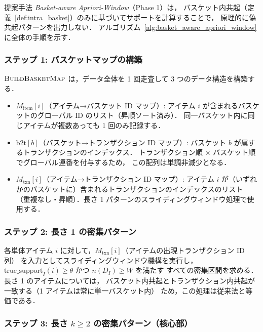 提案手法 \emph{Basket-aware Apriori-Window}（Phase 1）は，
バスケット内共起（定義~\ref{def:intra_basket}）のみに基づいてサポートを計算することで，
原理的に偽共起パターンを出力しない．
アルゴリズム~\ref{alg:basket_aware_apriori_window} に全体の手順を示す．



\subsubsection{ステップ 1: バスケットマップの構築}

$\Call{BuildBasketMap}{}$ は，データ全体を 1 回走査して 3 つのデータ構造を構築する．

\begin{itemize}
    \item $M_{\text{item}}[i]$（アイテム→バスケット ID マップ）:
    アイテム $i$ が含まれるバスケットのグローバル ID のリスト（昇順ソート済み）．
    同一バスケット内に同じアイテムが複数あっても 1 回のみ記録する．

    \item $\text{b2t}[b]$（バスケット→トランザクション ID マップ）:
    バスケット $b$ が属するトランザクションのインデックス．
    トランザクション順 × バスケット順でグローバル連番を付与するため，
    この配列は単調非減少となる．

    \item $M_{\text{txn}}[i]$（アイテム→トランザクション ID マップ）:
    アイテム $i$ が（いずれかのバスケットに）含まれるトランザクションのインデックスのリスト
    （重複なし・昇順）．長さ 1 パターンのスライディングウィンドウ処理で使用する．
\end{itemize}

\subsubsection{ステップ 2: 長さ 1 の密集パターン}

各単体アイテム $i$ に対して，$M_{\text{txn}}[i]$（アイテムの出現トランザクション ID 列）
を入力としてスライディングウィンドウ機構を実行し，
$\text{true\_support}_I(i) \geq \theta$ かつ $n(D_I) \geq W$ を満たす
すべての密集区間を求める．長さ 1 のアイテムについては，
バスケット内共起とトランザクション内共起が一致する（1 アイテムは常に単一バスケット内）
ため，この処理は従来法と等価である．

\subsubsection{ステップ 3: 長さ $k \geq 2$ の密集パターン（核心部）}

